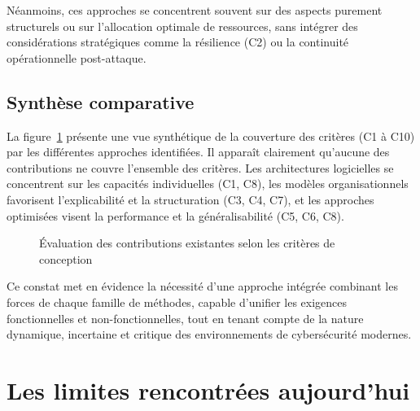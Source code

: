 \documentclass[ twoside,openright,titlepage,numbers=noenddot,headinclude,%
                footinclude=true,cleardoublepage=empty,abstractoff, %
                BCOR=5mm,paper=a4,fontsize=11pt,%
                french,american,%
                ]{scrreprt}
\begin{document}
Néanmoins, ces approches se concentrent souvent sur des aspects purement structurels ou sur l'allocation optimale de ressources, sans intégrer des considérations stratégiques comme la résilience (C2) ou la continuité opérationnelle post-attaque.

\subsection*{Synthèse comparative}

La figure~\ref{fig:revue-couverture-criteres} présente une vue synthétique de la couverture des critères (C1 à C10) par les différentes approches identifiées. Il apparaît clairement qu'aucune des contributions ne couvre l'ensemble des critères. Les architectures logicielles se concentrent sur les capacités individuelles (C1, C8), les modèles organisationnels favorisent l'explicabilité et la structuration (C3, C4, C7), et les approches optimisées visent la performance et la généralisabilité (C5, C6, C8).

\begin{figure}[h]
    \centering
    \caption{Évaluation des contributions existantes selon les critères de conception}
    \label{fig:revue-couverture-criteres}
\end{figure}

Ce constat met en évidence la nécessité d'une approche intégrée combinant les forces de chaque famille de méthodes, capable d'unifier les exigences fonctionnelles et non-fonctionnelles, tout en tenant compte de la nature dynamique, incertaine et critique des environnements de cybersécurité modernes.


\section{Les limites rencontrées aujourd'hui}\label{sec:limits-existing}
\end{document}

